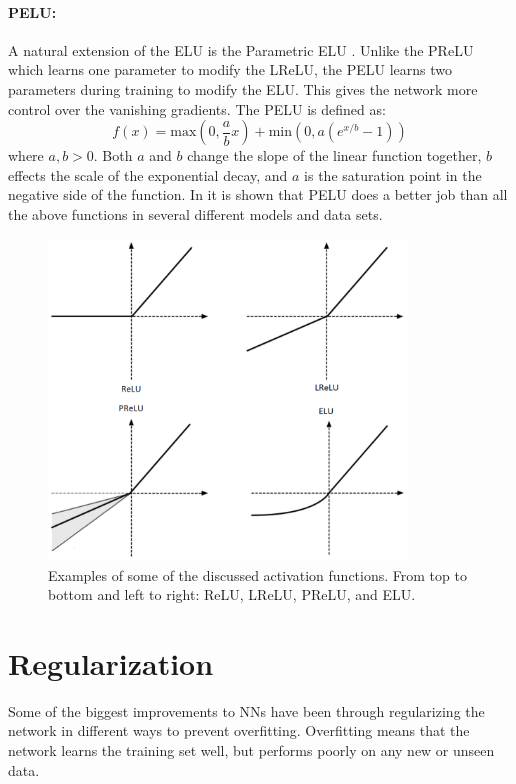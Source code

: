 \paragraph{PELU:}
A natural extension of the ELU is the Parametric ELU \cite{trottier2016parametric}. 
Unlike the PReLU which learns one parameter to modify the LReLU, the PELU learns two parameters during training to modify the ELU. 
This gives the network more control over the vanishing gradients. 
The PELU is defined as:
\begin{equation}
f(x) = \mbox{max}(0,\frac{a}{b}x) + \mbox{min}(0,a(e^{x/b}-1))
\label{e:pelu}
\end{equation}
where $a,b > 0$. 
Both $a$ and $b$ change the slope of the linear function together, $b$ effects the scale of the exponential decay, and $a$ is the saturation point in the negative side of the function. 
In \cite{trottier2016parametric} it is shown that PELU does a better job than all the above functions in several different models and data sets.

\begin{figure}[h!]
	\centering
		\includegraphics[width=0.85\textwidth]{figures/activations.png}
	\caption{Examples of some of the discussed activation functions. From top to bottom and left to right: ReLU, LReLU, PReLU, and ELU. \cite{}}
	\label{f:activations}
\end{figure}


\section{Regularization}
Some of the biggest improvements to NNs have been through regularizing the network in different ways to prevent overfitting.
Overfitting means that the network learns the training set well, but performs poorly on any new or unseen data.

